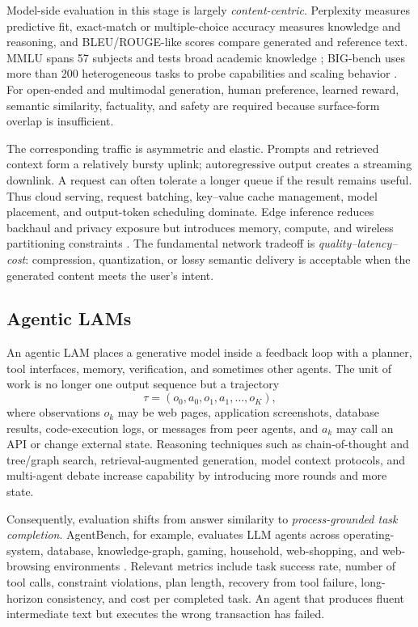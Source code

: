\documentclass[letterpaper,journal]{IEEEtran}
\begin{document}
Model-side evaluation in this stage is largely \emph{content-centric}.
Perplexity measures predictive fit, exact-match or multiple-choice accuracy
measures knowledge and reasoning, and BLEU/ROUGE-like scores compare generated
and reference text. MMLU spans 57 subjects and tests broad academic knowledge
\cite{mmlu}; BIG-bench uses more than 200 heterogeneous tasks to probe
capabilities and scaling behavior \cite{bigbench}. For open-ended and
multimodal generation, human preference, learned reward, semantic similarity,
factuality, and safety are required because surface-form overlap is
insufficient.

The corresponding traffic is asymmetric and elastic. Prompts and retrieved
context form a relatively bursty uplink; autoregressive output creates a
streaming downlink. A request can often tolerate a longer queue if the result
remains useful. Thus cloud serving, request batching, key--value cache
management, model placement, and output-token scheduling dominate. Edge
inference reduces backhaul and privacy exposure but introduces memory,
compute, and wireless partitioning constraints
\cite{beyondcloud,modeloffload}. The
fundamental network tradeoff is \emph{quality--latency--cost}: compression,
quantization, or lossy semantic delivery is acceptable when the generated
content meets the user's intent.

\subsection{Agentic LAMs}
An agentic LAM places a generative model inside a feedback loop with a planner,
tool interfaces, memory, verification, and sometimes other agents. The unit of
work is no longer one output sequence but a trajectory
\[
\tau=(o_0,a_0,o_1,a_1,\ldots,o_K),
\]
where observations $o_k$ may be web pages, application screenshots, database
results, code-execution logs, or messages from peer agents, and $a_k$ may call
an API or change external state. Reasoning techniques such as chain-of-thought
and tree/graph search, retrieval-augmented generation, model context
protocols, and multi-agent debate increase capability by introducing more
rounds and more state.

Consequently, evaluation shifts from answer similarity to
\emph{process-grounded task completion}. AgentBench, for example, evaluates
LLM agents across operating-system, database, knowledge-graph, gaming,
household, web-shopping, and web-browsing environments
\cite{agentbench}. Relevant metrics include task success rate, number of tool
calls, constraint violations, plan length, recovery from tool failure,
long-horizon consistency, and cost per completed task. An agent that produces
fluent intermediate text but executes the wrong transaction has failed.
\end{document}

